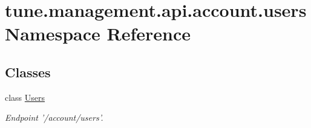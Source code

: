 \hypertarget{namespacetune_1_1management_1_1api_1_1account_1_1users}{\section{tune.\-management.\-api.\-account.\-users Namespace Reference}
\label{namespacetune_1_1management_1_1api_1_1account_1_1users}
}
\subsection*{Classes}
\begin{DoxyCompactItemize}
\item 
class \hyperlink{classtune_1_1management_1_1api_1_1account_1_1users_1_1Users}{Users}
\begin{DoxyCompactList}\small\item\em Endpoint '/account/users'. \end{DoxyCompactList}\end{DoxyCompactItemize}
